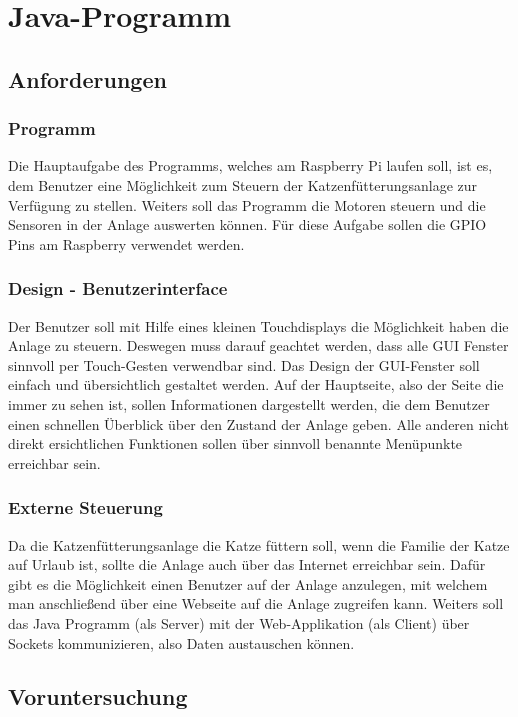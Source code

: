 
\chapter{Java-Programm}
\label{sec:java-programm}

\section{Anforderungen}
\subsection{Programm}
Die Hauptaufgabe des Programms, welches am Raspberry Pi laufen soll, ist es, dem Benutzer eine Möglichkeit zum Steuern der Katzenfütterungsanlage zur Verfügung zu stellen. Weiters soll das Programm die Motoren steuern und die Sensoren in der Anlage auswerten können. Für diese Aufgabe sollen die \ac{GPIO} Pins am Raspberry verwendet werden.
\subsection{Design - Benutzerinterface}
Der Benutzer soll mit Hilfe eines kleinen Touchdisplays die Möglichkeit haben die Anlage zu steuern. Deswegen muss darauf geachtet werden, dass alle \ac{GUI} Fenster sinnvoll per Touch-Gesten verwendbar sind.
Das Design der \ac{GUI}-Fenster soll einfach und übersichtlich gestaltet werden. Auf der Hauptseite, also der Seite die immer zu sehen ist, sollen Informationen dargestellt werden, die dem Benutzer einen schnellen Überblick über den Zustand der Anlage geben. Alle anderen nicht direkt ersichtlichen Funktionen sollen über sinnvoll benannte Menüpunkte erreichbar sein.
\subsection{Externe Steuerung}
Da die Katzenfütterungsanlage die Katze füttern soll, wenn die Familie der Katze auf Urlaub ist, sollte die Anlage auch über das Internet erreichbar sein. Dafür gibt es die Möglichkeit einen Benutzer auf der Anlage anzulegen, mit welchem man anschließend über eine Webseite auf die Anlage zugreifen kann. Weiters soll das Java Programm (als Server) mit der Web-Applikation (als Client) über Sockets kommunizieren, also Daten austauschen können.

\newpage

\section{Voruntersuchung}
